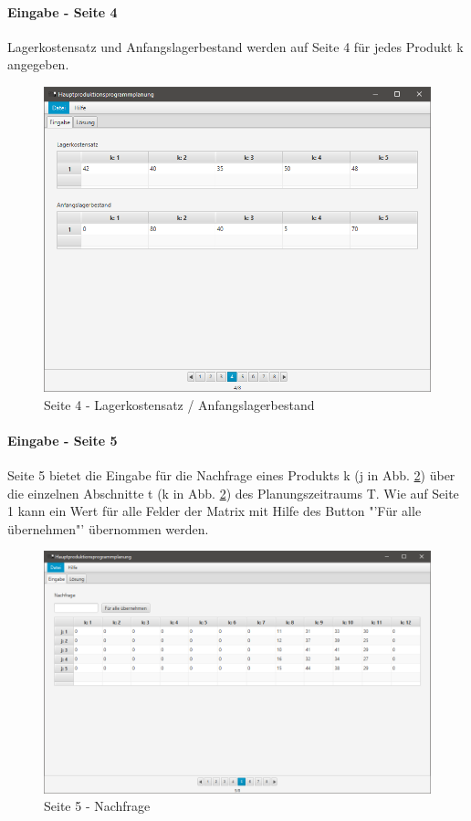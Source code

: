 \documentclass[12pt,a4paper, listof=entryprefix, bibliography=totocnumbered,toc=listofnumbered,lof=listofnumbered]{scrartcl}
\begin{document}
\pagebreak

\paragraph{Eingabe - Seite 4}
Lagerkostensatz und Anfangslagerbestand werden auf Seite 4 für jedes Produkt k angegeben.

\begin{figure}[H]
	\centering
	\includegraphics[width=.8\linewidth]{images/seite4.png} 
	\caption{Seite 4 - Lagerkostensatz / Anfangslagerbestand}
	\label{fig:seite4}
\end{figure}

\pagebreak

\paragraph{Eingabe - Seite 5}
Seite 5 bietet die Eingabe für die Nachfrage eines Produkts k (j in Abb. \ref{fig:seite5}) über die einzelnen Abschnitte t (k in Abb. \ref{fig:seite5}) des Planungszeitraums T. Wie auf Seite 1 kann ein Wert für alle Felder der Matrix mit Hilfe des Button "'Für alle übernehmen"' übernommen werden.

\begin{figure}[H]
	\centering
	\includegraphics[width=.8\linewidth]{images/seite5.png} 
	\caption{Seite 5 - Nachfrage}
	\label{fig:seite5}
\end{figure}
\end{document}
